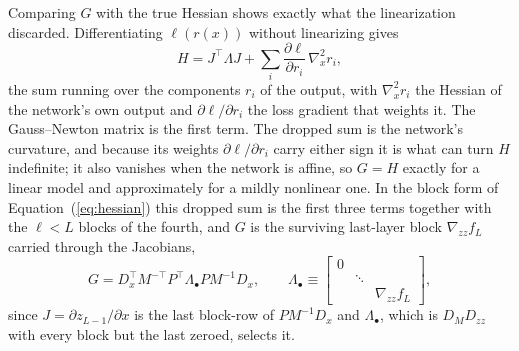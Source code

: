 \documentclass{article}
\begin{document}
Comparing $G$ with the true Hessian shows exactly what the linearization
discarded. Differentiating $\ell(r(x))$ without linearizing gives
\begin{equation}
  \label{eq:ggn-vs-h}
  H = J^\top \Lambda J + \sum_i \frac{\partial \ell}{\partial r_i}\, \nabla^2_x r_i,
\end{equation}
the sum running over the components $r_i$ of the output, with $\nabla^2_x r_i$
the Hessian of the network's own output and $\partial \ell / \partial r_i$ the
loss gradient that weights it. The Gauss--Newton matrix is the first term. The
dropped sum is the network's curvature, and because its weights
$\partial \ell / \partial r_i$ carry either sign it is what can turn $H$
indefinite; it also vanishes when the network is affine, so $G = H$ exactly for a
linear model and approximately for a mildly nonlinear one. In the block form of
Equation~(\ref{eq:hessian}) this dropped sum is the first three terms together
with the $\ell < L$ blocks of the fourth, and $G$ is the surviving last-layer
block $\nabla_{zz} f_L$ carried through the Jacobians,
\begin{equation}
  \label{eq:ggn-block}
  G = D_x^\top M^{-\top} P^\top \Lambda_\bullet P M^{-1} D_x,
  \qquad
  \Lambda_\bullet \equiv
  \begin{bmatrix}
    0 &        &                 \\
      & \ddots &                 \\
      &        & \nabla_{zz} f_L
  \end{bmatrix},
\end{equation}
since $J = \partial z_{L-1} / \partial x$ is the last block-row of $P M^{-1} D_x$
and $\Lambda_\bullet$, which is $D_M D_{zz}$ with every block but the last
zeroed, selects it.
\end{document}

